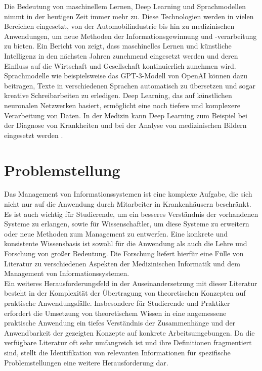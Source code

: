 Die Bedeutung von maschinellem Lernen, Deep Learning und Sprachmodellen nimmt in der heutigen Zeit immer mehr zu. 
Diese Technologien werden in vielen Bereichen eingesetzt, von der Automobilindustrie bis hin zu medizinischen Anwendungen, um neue Methoden der Informationsgewinnung und -verarbeitung zu bieten.
Ein Bericht von \citet{hwwi} zeigt, dass maschinelles Lernen und künstliche Intelligenz in den nächsten Jahren zunehmend eingesetzt werden und deren Einfluss auf die Wirtschaft und Gesellschaft kontinuierlich zunehmen wird.
Sprachmodelle wie beispielsweise das GPT-3-Modell von OpenAI \citep{gpt3} können dazu beitragen, Texte in verschiedenen Sprachen automatisch zu übersetzen und sogar kreative Schreibarbeiten zu erledigen. 
Deep Learning, das auf künstlichen neuronalen Netzwerken basiert, ermöglicht eine noch tiefere und komplexere Verarbeitung von Daten. 
In der Medizin kann Deep Learning zum Beispiel bei der Diagnose von Krankheiten und bei der Analyse von medizinischen Bildern eingesetzt werden \citep{skincancer}.

\section{Problemstellung}\label{sec:problemstellung}
Das Management von Informationssystemen ist eine komplexe Aufgabe, die sich nicht nur auf die Anwendung durch Mitarbeiter in Krankenhäusern beschränkt.
Es ist auch wichtig für Studierende, um ein besseres Verständnis der vorhandenen Systeme zu erlangen, sowie für Wissenschaftler, um diese Systeme zu erweitern oder neue Methoden zum Management zu entwerfen.
Eine konkrete und konsistente Wissensbasis ist sowohl für die Anwendung als auch die Lehre und Forschung von großer Bedeutung.
Die Forschung liefert hierfür eine Fülle von Literatur zu verschiedenen Aspekten der Medizinischen Informatik und dem Management von Informationssystemen.\\

Ein weiteres Herausforderungsfeld in der Auseinandersetzung mit dieser Literatur besteht in der Komplexität der Übertragung von theoretischen Konzepten auf praktische Anwendungsfälle. 
Insbesondere für Studierende und Praktiker erfordert die Umsetzung von theoretischem Wissen in eine angemessene praktische Anwendung ein tiefes Verständnis der Zusammenhänge und der Anwendbarkeit der gezeigten Konzepte auf konkrete Arbeitsumgebungen. 
Da die verfügbare Literatur oft sehr umfangreich ist und ihre Definitionen fragmentiert sind, stellt die Identifikation von relevanten Informationen für spezifische Problemstellungen eine weitere Herausforderung dar.\\

